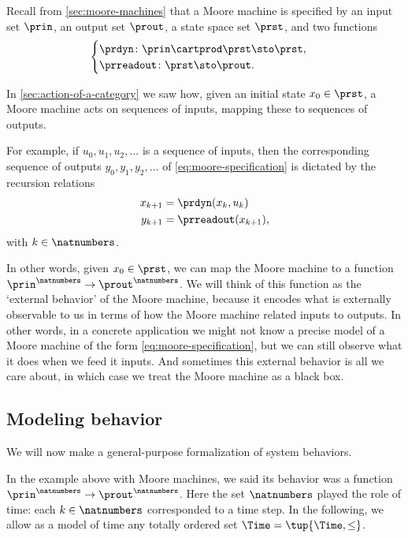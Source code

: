 
Recall from \cref{sec:moore-machines} that a Moore machine is specified by an input set $\prin$, an output set $\prout$, a state space set $\prst$, and two functions
\begin{equation}\label{eq:moore-specification}
    \begin{cases}
        \prdyn \colon \prin \cartprod \prst \sto \prst, \\
        \prreadout \colon \prst \sto \prout.
    \end{cases}
\end{equation}

In \cref{sec:action-of-a-category} we saw how, given an initial state $x_0 \in \prst$, a Moore machine acts on sequences of inputs, mapping these to sequences of outputs. 

For example, if $u_0, u_1, u_2, ... $ is a sequence of inputs, then the corresponding sequence of outputs $y_0, y_1, y_2, ... $ of \cref{eq:moore-specification} is dictated by the recursion relations
\begin{align}
x_{k+1} &= \prdyn(x_k, u_k) \\
y_{k+1} &= \prreadout(x_{k+1}),
\end{align}
with $k \in \natnumbers$. 

In other words, given $x_0 \in \prst$, we can map the Moore machine \label{eq:moore-again} to a function $\prin^\natnumbers \to \prout^\natnumbers$. We will think of this function as the `external behavior' of the Moore machine, because it encodes what is externally observable to us in terms of how the Moore machine related inputs to outputs. In other words, in a concrete application we might not know a precise model of a Moore machine of the form \cref{eq:moore-specification}, but we can still observe what it does when we feed it inputs. And sometimes this external behavior is all we care about, in which case we treat the Moore machine as a black box. 

\subsection{Modeling behavior}

We will now make a general-purpose formalization of system behaviors. 

In the example above with Moore machines, we said its behavior was a function $\prin^\natnumbers \to \prout^\natnumbers$. Here the set $\natnumbers$ played the role of time: each $k \in \natnumbers$ corresponded to a time step. In the following, we allow as a model of time any totally ordered set $\Time = \tup{\Time, \leq}$. 

